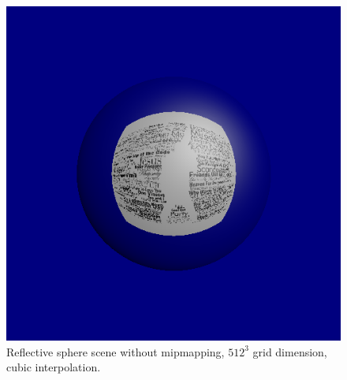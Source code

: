 \documentclass[12pt]{article}
\newcommand{\testhighres}{512}
\begin{document}
\begin{figure}[H]
	\centering
	\includegraphics[width=0.6\linewidth]{images/spere_mirror_high_nolod_cubic}
	\caption{Reflective sphere scene without mipmapping, $\testhighres^3$ grid dimension, cubic interpolation.}
	\label{fig:testnomipmap}
\end{figure}
\end{document}
